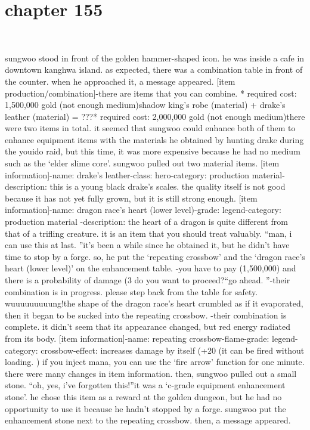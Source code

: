 \section{chapter 155}

                             




sungwoo stood in front of the golden hammer-shaped icon.
 he was inside a cafe in downtown kanghwa island.
 as expected, there was a combination table in front of the counter.
when he approached it, a message appeared.
[item production/combination]-there are items that you can combine.
* required cost: 1,500,000 gold (not enough medium)shadow king’s robe (material) + drake’s leather (material) = ???* required cost: 2,000,000 gold (not enough medium)there were two items in total.
 it seemed that sungwoo could enhance both of them to enhance equipment items with the materials he obtained by hunting drake during the youido raid, but this time, it was more expensive because he had no medium such as the ‘elder slime core’.
sungwoo pulled out two material items.
[item information]-name: drake’s leather-class: hero-category: production material-description: this is a young black drake’s scales.
 the quality itself is not good because it has not yet fully grown, but it is still strong enough.
[item information]-name: dragon race’s heart (lower level)-grade: legend-category: production material
-description: the heart of a dragon is quite different from that of a trifling creature.
 it is an item that you should treat valuably.
“man, i can use this at last.
”it’s been a while since he obtained it, but he didn’t have time to stop by a forge.
so, he put the ‘repeating crossbow’ and the ‘dragon race’s heart (lower level)’ on the enhancement table.
-you have to pay (1,500,000) and there is a probability of damage (3%
 do you want to proceed?“go ahead.
”-their combination is in progress.
 please step back from the table for safety.
wuuuuuuuuung!the shape of the dragon race’s heart crumbled as if it evaporated, then it began to be sucked into the repeating crossbow.
-their combination is complete.
it didn’t seem that its appearance changed, but red energy radiated from its body.
[item information]-name: repeating crossbow-flame-grade: legend-category: crossbow-effect: increases damage by itself (+20%
 (it can be fired without loading.
) if you inject mana, you can use the ‘fire arrow’ function for one minute.
there were many changes in item information.
 then, sungwoo pulled out a small stone.
“oh, yes, i’ve forgotten this!”it was a ‘c-grade equipment enhancement stone’.
 he chose this item as a reward at the golden dungeon, but he had no opportunity to use it because he hadn’t stopped by a forge.
sungwoo put the enhancement stone next to the repeating crossbow.
 then, a message appeared.

